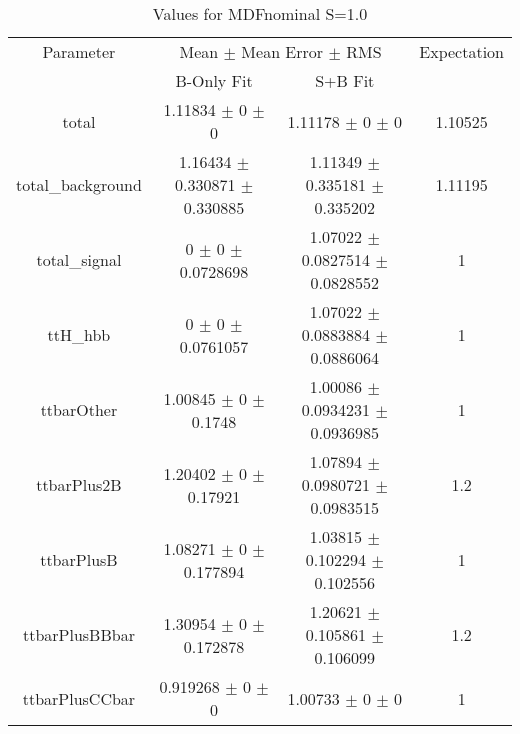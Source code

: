 \begin{table}
\centering
\caption{Values for MDFnominal S=1.0}
\begin{tabular}{cccc}
\toprule
Parameter & \multicolumn{2}{c}{Mean $\pm$ Mean Error $\pm$ RMS} & Expectation\\
 & B-Only Fit & S+B Fit & \\
\midrule
total & \num{1.11834} $\pm$ \num{0} $\pm$ \num{0} & \num{1.11178} $\pm$ \num{0} $\pm$ \num{0} & \num{1.10525}\\
total\_background & \num{1.16434} $\pm$ \num{0.330871} $\pm$ \num{0.330885} & \num{1.11349} $\pm$ \num{0.335181} $\pm$ \num{0.335202} & \num{1.11195}\\
total\_signal & \num{0} $\pm$ \num{0} $\pm$ \num{0.0728698} & \num{1.07022} $\pm$ \num{0.0827514} $\pm$ \num{0.0828552} & \num{1}\\
ttH\_hbb & \num{0} $\pm$ \num{0} $\pm$ \num{0.0761057} & \num{1.07022} $\pm$ \num{0.0883884} $\pm$ \num{0.0886064} & \num{1}\\
ttbarOther & \num{1.00845} $\pm$ \num{0} $\pm$ \num{0.1748} & \num{1.00086} $\pm$ \num{0.0934231} $\pm$ \num{0.0936985} & \num{1}\\
ttbarPlus2B & \num{1.20402} $\pm$ \num{0} $\pm$ \num{0.17921} & \num{1.07894} $\pm$ \num{0.0980721} $\pm$ \num{0.0983515} & \num{1.2}\\
ttbarPlusB & \num{1.08271} $\pm$ \num{0} $\pm$ \num{0.177894} & \num{1.03815} $\pm$ \num{0.102294} $\pm$ \num{0.102556} & \num{1}\\
ttbarPlusBBbar & \num{1.30954} $\pm$ \num{0} $\pm$ \num{0.172878} & \num{1.20621} $\pm$ \num{0.105861} $\pm$ \num{0.106099} & \num{1.2}\\
ttbarPlusCCbar & \num{0.919268} $\pm$ \num{0} $\pm$ \num{0} & \num{1.00733} $\pm$ \num{0} $\pm$ \num{0} & \num{1}\\
\bottomrule
\end{tabular}
\end{table}